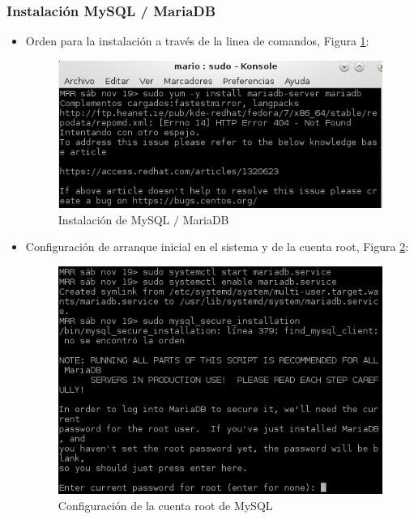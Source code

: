 \subsubsection{Instalación MySQL /  MariaDB}
	\begin{itemize}
		\item Orden para la instalación a través de la linea de comandos, Figura \ref{fig:figura28}:
		\begin{figure}[H] %
			\centering
			\includegraphics[scale=0.5]{figuras/figura28.png} 
			\caption{Instalación de MySQL $ / $ MariaDB} 
			\label{fig:figura28}
		\end{figure}
	
		\item Configuración de arranque inicial en el sistema y de la cuenta root, Figura \ref{fig:figura29}:
		\begin{figure}[H] %
			\centering
			\includegraphics[scale=0.6]{figuras/figura29.png} 
			\caption{Configuración de la cuenta root de MySQL} 
			\label{fig:figura29}
		\end{figure}
	\end{itemize}
		
